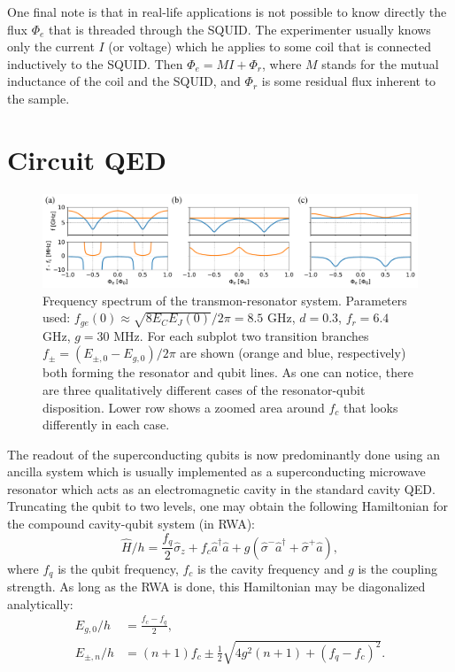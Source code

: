 \documentclass[%
 aip,
 amsmath,amssymb,
 reprint,%
]{revtex4-1}
\begin{document}
One final note is that in real-life applications is not possible to know directly the flux $\Phi_e$ that is threaded through the SQUID. The experimenter usually knows only the current $I$ (or voltage) which he applies to some coil that is connected inductively to the SQUID. Then $\Phi_e = M I + \Phi_r$, where $M$ stands for the mutual inductance of the coil and the SQUID, and $\Phi_r$ is some residual flux inherent to the sample.

\section{Circuit QED}\label{sec:cqed}


\begin{figure}
	\centering
	\includegraphics[width=\textwidth]{anti_theor}
	\caption{Frequency spectrum of the transmon-resonator system. Parameters used: $f_{ge}(0) \approx \sqrt{8E_C E_J(0)}/2\pi = 8.5$ GHz, $d=0.3$, $f_r=6.4$ GHz, $g = 30$ MHz. For each subplot two transition branches  $f_{\pm} = (E_{\pm,0} - E_{g,0})/2\pi$ are shown (orange and blue, respectively) both forming the resonator and qubit lines. As one can notice, there are three qualitatively different cases of the resonator-qubit disposition. Lower row shows a zoomed area around $f_c$ that looks differently in each case.}
	\label{fig:anti_theor}
\end{figure}

The readout of the superconducting qubits is now predominantly done using an ancilla system which is usually implemented as a superconducting microwave resonator which acts as an electromagnetic cavity in the standard cavity QED. Truncating the qubit to two levels, one may obtain the following Hamiltonian for the compound cavity-qubit system (in RWA):
\begin{equation}
\hat H/h = \frac{f_q}{2} \hat \sigma_z + f_c \hat a^\dagger \hat a + g(\hat \sigma^- \hat a^\dagger + \hat \sigma^+ \hat a),
\end{equation}
where $f_q$ is the qubit frequency, $f_c$ is the cavity frequency and $g$ is the coupling strength. As long as the RWA is done, this Hamiltonian may be diagonalized analytically\cite{blais2004}:
\begin{align}
E_{g, 0}/h &= \frac{f_c - f_q}{2},\label{eq:branches1}
\\
E_{\pm, n}/h &= (n+1)f_c \pm \frac{1}{2}\sqrt{4g^2(n+1)+(f_q-f_c)^2}.
\label{eq:branches2}
\end{align}
\end{document}
